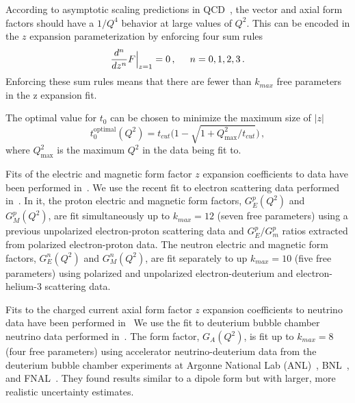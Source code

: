   According to asymptotic scaling predictions in QCD~\cite{Lepage:1980fj}, the
  vector and axial form factors should have a $1/Q^4$ behavior at large values
  of $Q^2$. This can be encoded in the $z$ expansion parameterization by
  enforcing four sum rules~\cite{Lee:2015jqa}
  \begin{align}\label{eq:zsumrules}
    \frac{d^n}{dz^n} F\Big\rvert_{z=1} = 0\,, \hspace{5mm} n=0,1,2,3 \,.
  \end{align}
  Enforcing these sum rules means that there are fewer than $k_{max}$ free
  parameters in the z expansion fit.

  The optimal value for $t_0$ can be chosen to minimize the maximum size of
  $|z|$~\cite{Meyer:2016oeg}
  \begin{equation}\label{eq:topt}
    t_0^{\textrm{optimal}}(Q^2) = t_{cut}\Big(1 - \sqrt{1+Q^2_{\textrm{max}}/t_{cut}}\Big) \,,
  \end{equation}
  where $Q^2_{\textrm{max}}$ is the maximum $Q^2$ in the data being fit to.

  Fits of the electric and magnetic form factor $z$ expansion coefficients to
  data have been performed
  in~\cite{Hill:2010yb,Epstein:2014zua,Lee:2015jqa,Ye:2017gyb}.  We use the
  recent fit to electron scattering data performed in~\cite{Ye:2017gyb}. In it,
  the proton electric and magnetic form factors, $G_E^p(Q^2)$ and $G_M^p(Q^2)$,
  are fit simultaneously up to $k_{max} = 12$ (seven free parameters) using a
  previous unpolarized electron-proton scattering data and $G_E^p/G_m^p$ ratios
  extracted from polarized electron-proton data. The neutron electric and
  magnetic form factors, $G_E^n(Q^2)$ and $G_M^n(Q^2)$, are fit separately to
  up $k_{max} = 10$ (five free parameters) using polarized and unpolarized
  electron-deuterium and electron-helium-3 scattering data.

  Fits to the charged current axial form factor $z$ expansion coefficients to
  neutrino data have been performed
  in~\cite{Bhattacharya:2011ah,Bhattacharya:2015mpa,Meyer:2016oeg} We use the
  fit to deuterium bubble chamber neutrino data performed
  in~\cite{Meyer:2016oeg}. The form factor, $G_A(Q^2)$, is fit up to $k_{max} =
  8$ (four free parameters) using accelerator neutrino-deuterium data from the
  deuterium bubble chamber experiments at Argonne National Lab
  (ANL)~\cite{Mann:1973pr,Barish:1977qk,Miller:1982qi},
  BNL~\cite{Baker:1981su}, and FNAL~\cite{Kitagaki:1983px}. They found results
  similar to a dipole form but with larger, more realistic uncertainty
  estimates.


